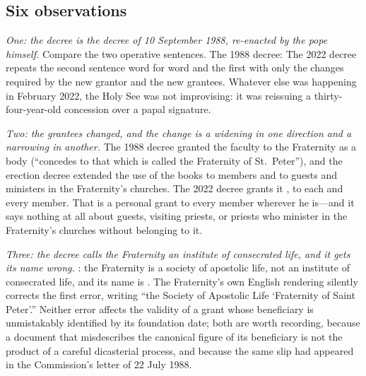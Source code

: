 \subsection{Six observations}

\emph{One: the decree is the decree of 10 September 1988, re-enacted by
the pope himself.} Compare the two operative sentences. The 1988 decree:
 The 2022 decree repeats the second sentence
word for word and the first with only the changes required by the new
grantor and the new grantees. Whatever else was happening in February
2022, the Holy See was not improvising: it was reissuing a thirty-four-year-old
concession over a papal signature.

\emph{Two: the grantees changed, and the change is a widening in one
direction and a narrowing in another.} The 1988 decree granted the
faculty to the Fraternity as a body (``concedes to that which is called
the Fraternity of St.\ Peter''), and the erection decree extended the use
of the books to members and to guests and ministers in the Fraternity's
churches. The 2022 decree grants it ,
to each and every member. That is a personal grant to every member
wherever he is---and it says nothing at all about guests, visiting priests,
or priests who minister in the Fraternity's churches without belonging to
it.

\emph{Three: the decree calls the Fraternity an institute of consecrated
life, and it gets its name wrong.} : the Fraternity is a society of
apostolic life, not an institute of consecrated life, and its name is
. The Fraternity's own
English rendering silently corrects the first error, writing ``the Society
of Apostolic Life `Fraternity of Saint Peter'.'' Neither error affects
the validity of a grant whose beneficiary is unmistakably identified by
its foundation date; both are worth recording, because a document that
misdescribes the canonical figure of its beneficiary is not the product of
a careful dicasterial process, and because the same slip had appeared in
the Commission's letter of 22 July 1988.

